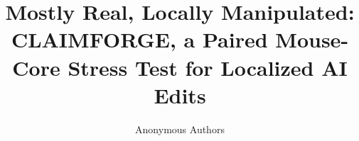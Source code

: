 \documentclass[letterpaper]{article}
\title{Mostly Real, Locally Manipulated: CLAIMFORGE, a Paired Mouse-Core Stress Test for Localized AI Edits}
\author{Anonymous Authors}
\begin{document}
\maketitle

\begin{abstract}

\end{abstract}










\end{document}
